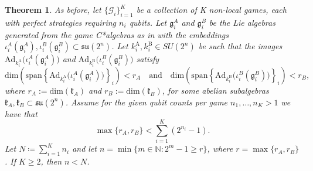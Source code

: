\documentclass{article}
\newtheorem{theorem}{Theorem}
\begin{document}
    \begin{theorem}\label{theorem: qubit reduction}
        As before, let $\{\mathcal{G}_i\}_{i=1}^K$ be a collection of K non-local games, each with perfect strategies requiring $n_i$ qubits. Let $\mathfrak{g}_i^A$ and $\mathfrak{g}_i^B$ be the Lie algebras generated from the game C*algebras as in  with the embeddings $\iota_i^A(\mathfrak g_i^A),\iota_i^B(\mathfrak g_i^B)\subset \mathfrak{su}(2^n)$. Let $k_i^{\mathrm A},k_i^{\mathrm B}\in SU(2^n)$ be such that the images $\mathrm{Ad}_{k_i^{\mathrm A}}\big(\iota_i^A(\mathfrak g_i^A)\big)$ and $\mathrm{Ad}_{k_i^{\mathrm B}}\big(\iota_i^B(\mathfrak g_i^B)\big)$ satisfy 
        \begin{equation}\label{eq: big Lie assumption}            
            \mathrm{dim}\left(\mathrm{span}\left\{\mathrm{Ad}_{k_i^{\mathrm A}}\big(\iota_i^A(\mathfrak g_i^A)\big)\right\}_i\right)<r_A\quad\text{and}\quad \mathrm{dim}\left(\mathrm{span}\left\{\mathrm{Ad}_{k_i^{\mathrm B}}\big(\iota_i^B(\mathfrak g_i^B)\big)\right\}_i\right)<r_B,
        \end{equation}
        where $r_A:=\mathrm{dim}(\mathfrak k_A)$ and $r_B:=\mathrm{dim}(\mathfrak k_B)$, for some abelian subalgebras $\mathfrak k_A,\mathfrak k_B\subset \mathfrak{su}(2^n)$. Assume for the given qubit counts per game $n_1,\dots,n_K>1$ we have that 
        \begin{equation}\label{eq: max rarb}
            \max\{r_A,r_B\}<\sum\limits_{i=1}^K (2^{n_i}-1).
        \end{equation}
        Let $N\coloneqq\sum\limits_{i=1}^K n_i$ and let $n=\min\{m\in\mathbb{N}: 2^m-1\geq r\}$, where $r=\max\{r_A,r_B\}$. If $K\geq 2$, then $n<N$.
    \end{theorem}
    
\end{document}

